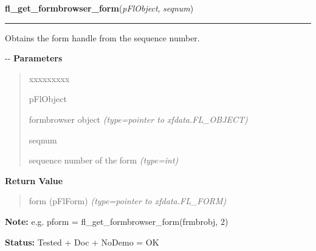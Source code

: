     \vspace{0.5ex}

\hspace{.8\funcindent}\begin{boxedminipage}{\funcwidth}

    \raggedright \textbf{fl\_get\_formbrowser\_form}(\textit{pFlObject}, \textit{seqnum})

    \vspace{-1.5ex}

    \rule{\textwidth}{0.5\fboxrule}
\setlength{\parskip}{2ex}

Obtains the form handle from the sequence number.

-{}-
\setlength{\parskip}{1ex}
      \textbf{Parameters}
      \vspace{-1ex}

      \begin{quote}
        \begin{Ventry}{xxxxxxxxx}

          \item[pFlObject]


formbrowser object
            {\it (type=pointer to xfdata.FL\_OBJECT)}

          \item[seqnum]


sequence number of the form
            {\it (type=int)}

        \end{Ventry}

      \end{quote}

      \textbf{Return Value}
    \vspace{-1ex}

      \begin{quote}

form (pFlForm)
      {\it (type=pointer to xfdata.FL\_FORM)}

      \end{quote}

\textbf{Note:} 
e.g. pform = fl\_get\_formbrowser\_form(frmbrobj, 2)


\textbf{Status:} 
Tested + Doc + NoDemo = OK


    \end{boxedminipage}



